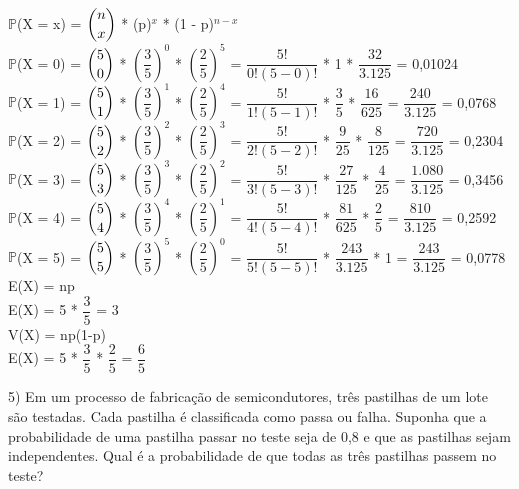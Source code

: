 \documentclass[12pt,a4paper,draft]{article}
\begin{document}
	\begin{center}
		$\mathbb{P}$(X = x) = $\dbinom{n}{x}$ * (p)$^{x}$ * (1 - p)$^{n - x}$
		\vspace{1cm}\\
		$\mathbb{P}$(X = 0) = $\dbinom{5}{0}$ * $\left(\dfrac{3}{5}\right)^0$ * $\left(\dfrac{2}{5}\right)^5$ = $\dfrac{5!}{0!(5-0)!}$ * 1 * $\dfrac{32}{3.125}$ = 0,01024
		\vspace{0.5cm}\\
		$\mathbb{P}$(X = 1) = $\dbinom{5}{1}$ * $\left(\dfrac{3}{5}\right)^1$ * $\left(\dfrac{2}{5}\right)^4$ = $\dfrac{5!}{1!(5-1)!}$ * $\dfrac{3}{5}$ * $\dfrac{16}{625}$ = $\dfrac{240}{3.125}$ = 0,0768
		\vspace{0.5cm}\\
		$\mathbb{P}$(X = 2) = $\dbinom{5}{2}$ * $\left(\dfrac{3}{5}\right)^2$ * $\left(\dfrac{2}{5}\right)^3$ = $\dfrac{5!}{2!(5-2)!}$ * $\dfrac{9}{25}$ * $\dfrac{8}{125}$ = $\dfrac{720}{3.125}$ = 0,2304
		\vspace{1cm}\\
		$\mathbb{P}$(X = 3) = $\dbinom{5}{3}$ * $\left(\dfrac{3}{5}\right)^3$ * $\left(\dfrac{2}{5}\right)^2$ = $\dfrac{5!}{3!(5-3)!}$ * $\dfrac{27}{125}$ * $\dfrac{4}{25}$ = $\dfrac{1.080}{3.125}$ = 0,3456
		\vspace{0.5cm}\\
		$\mathbb{P}$(X = 4) = $\dbinom{5}{4}$ * $\left(\dfrac{3}{5}\right)^4$ * $\left(\dfrac{2}{5}\right)^1$ = $\dfrac{5!}{4!(5-4)!}$ * $\dfrac{81}{625}$ * $\dfrac{2}{5}$ = $\dfrac{810}{3.125}$ = 0,2592
		\vspace{0.5cm}\\
		$\mathbb{P}$(X = 5) = $\dbinom{5}{5}$ * $\left(\dfrac{3}{5}\right)^5$ * $\left(\dfrac{2}{5}\right)^0$ = $\dfrac{5!}{5!(5-5)!}$ * $\dfrac{243}{3.125}$ * 1 = $\dfrac{243}{3.125}$ = 0,0778
		\vspace{1cm}\\
		E(X) = np
		\vspace{0.5cm}\\
		E(X) = 5 * $\dfrac{3}{5}$ = 3
		\vspace{1cm}\\
		V(X) = np(1-p)
		\vspace{0.5cm}\\
		E(X) = 5 * $\dfrac{3}{5}$ * $\dfrac{2}{5}$ = $\dfrac{6}{5}$
	\end{center}
	\vspace{1cm}
	5) Em um processo de fabricação de semicondutores, três pastilhas de um lote são testadas. Cada pastilha é classificada como passa ou falha. Suponha que a probabilidade de uma pastilha passar no teste seja de 0,8 e que as pastilhas sejam independentes. Qual é a probabilidade de que todas as três pastilhas passem no teste?
\end{document}

